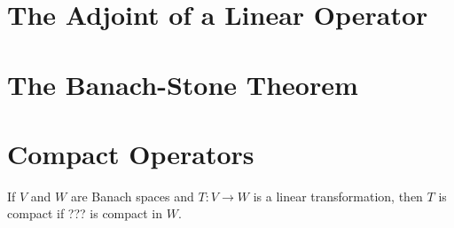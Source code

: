 \section{The Adjoint of a Linear Operator}


\section{The Banach-Stone Theorem}



\section{Compact Operators}
\begin{definition}
    If $V$ and $W$ are Banach spaces and $T:V\to W$ is a linear transformation,
    then $T$ is compact if ??? is compact in $W$.
\end{definition}
